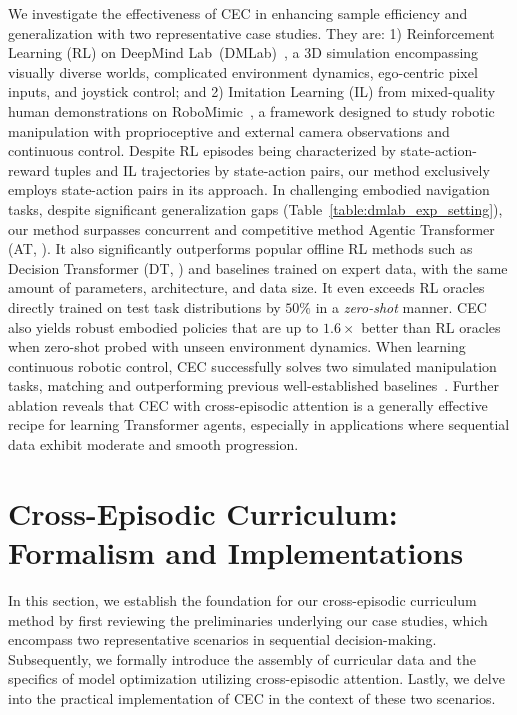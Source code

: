 \documentclass{article}
\newcommand{\cec}[0]{\mbox{CEC}\xspace}
\begin{document}

We investigate the effectiveness of \cec in enhancing sample efficiency and generalization with two representative case studies.
They are: 1) Reinforcement Learning (RL) on DeepMind Lab~(DMLab)~\citep{beattie2016deepmind}, a 3D simulation encompassing visually diverse worlds, complicated environment dynamics, ego-centric pixel inputs, and joystick control; and 2) Imitation Learning (IL) from mixed-quality human demonstrations on RoboMimic~\citep{mandlekar2021matters}, a framework designed to study robotic manipulation with proprioceptive and external camera observations and continuous control.
Despite RL episodes being characterized by state-action-reward tuples and IL trajectories by state-action pairs, our method exclusively employs state-action pairs in its approach.
In challenging embodied navigation tasks, despite significant generalization gaps (Table~\ref{table:dmlab_exp_setting}),
our method surpasses concurrent and competitive method Agentic Transformer (AT, \citet{liu2023emergent}).
It also significantly outperforms popular offline RL methods such as Decision Transformer (DT, \citet{chen2021decisiontransformer}) and baselines trained on expert data, with the same amount of parameters, architecture, and data size.
It even exceeds RL oracles directly trained on test task distributions
by $50\%$ in a \emph{zero-shot} manner.
\cec also yields robust embodied policies that are up to $1.6\times$ better than RL oracles when zero-shot probed with unseen environment dynamics.
When learning continuous robotic control, \cec successfully solves two simulated manipulation tasks, matching and outperforming previous well-established baselines~\cite {mandlekar2021matters,fujimoto2018offpolicy,kumar2020conservative}.
Further ablation reveals that \cec with cross-episodic attention is a generally effective recipe for learning Transformer agents, especially in applications where sequential data exhibit moderate and smooth progression.
\section{Cross-Episodic Curriculum: Formalism and Implementations}
\label{sec:method}
In this section, we establish the foundation for our cross-episodic curriculum method by first reviewing the preliminaries underlying our case studies, which encompass two representative scenarios in sequential decision-making. Subsequently, we formally introduce the assembly of curricular data and the specifics of model optimization utilizing cross-episodic attention. Lastly, we delve into the practical implementation of \cec in the context of these two scenarios.
\end{document}
